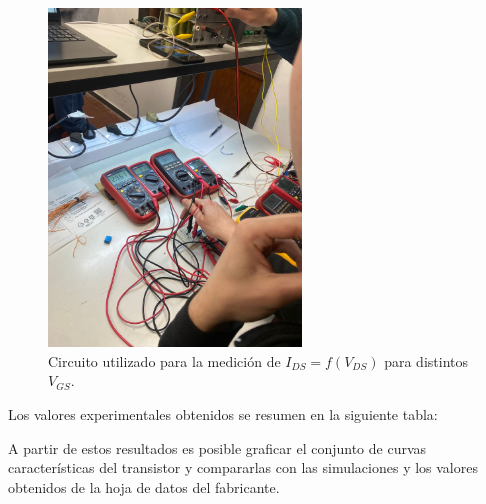     \begin{figure}[H]
    \centering
    \includegraphics[width=0.6\textwidth]{pictures/robada-tp3.jpeg}
    \caption{Circuito utilizado para la medición de $I_{DS} = f(V_{DS})$ para distintos $V_{GS}$.}
    \label{crkt:jfet-carac}
    \end{figure}
    
    Los valores experimentales obtenidos se resumen en la siguiente tabla:
    
    \begin{table}[H]
    \centering
    \caption{Valores de $I_{DS}$ en función de $V_{DS}$ para distintos valores de $V_{GS}$.}
    \label{tab:ids-vgs}
    \end{table}
    
    A partir de estos resultados es posible graficar el conjunto de curvas características 
    del transistor y compararlas con las simulaciones y los valores obtenidos de la hoja de datos del fabricante.
    
